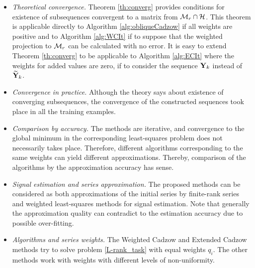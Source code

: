 \documentclass[sii]{ipart}
\begin{document}
	\begin{itemize}
		\item \textit{Theoretical convergence.}
		Theorem \ref{th:converg} provides conditions for existence of subsequences convergent to a matrix from $\mathcal{M}_r \cap \mathcal{H}$. This theorem is applicable directly to Algorithm \ref{alg:obliqueCadzow} if all weights are positive and to Algorithm \ref{alg:WCIt} if to suppose that the weighted projection to $\mathcal{M}_r$ can be calculated with no error. It is easy to extend Theorem \ref{th:converg} to be applicable to Algorithm \ref{alg:ECIt} where the weights for added values are zero, if to consider the sequence  $\mathbf{Y}_k$ instead of $\widetilde{\mathbf{Y}}_k$.
		\item \textit{Convergence in practice.} Although the theory says about existence of converging subsequences, the convergence of the constructed sequences took place in all the training examples.
		\item \textit{Comparison by accuracy.}
		The methods are iterative, and convergence to the global minimum in the corresponding least-squares problem does not necessarily takes place. Therefore, different algorithms corresponding to the same weights can yield different approximations. Thereby, comparison of the algorithms by the approximation accuracy has sense.		
\item \textit{Signal estimation and series approximation.}
		The proposed methods can be considered as both approximations of the initial series by finite-rank series and weighted least-squares methods for signal estimation. Note that generally the approximation quality can contradict to the estimation accuracy due to possible over-fitting.
		\item \textit{Algorithms and series weights.}
		The Weighted Cadzow and Extended Cadzow methods try to solve problem \eqref{L-rank_task} with equal weights $q_i$. The other methods work with weights with different levels of non-uniformity.

\end{itemize}
\end{document}
